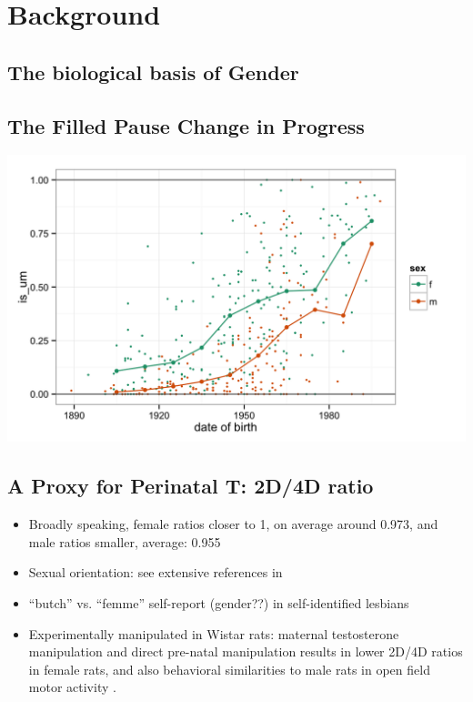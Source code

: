 \documentclass[a0,portrait]{a0poster}
\begin{document}
\begin{multicols}{2}
\begin{enumerate}
\end{enumerate}
\section*{Background}
\subsection{The biological basis of Gender}


\subsection{The Filled Pause Change in Progress}

\begin{center}\vspace{1cm}
\includegraphics[width=0.8\linewidth]{um.png}
\end{center}\vspace{1cm}

\subsection{A Proxy for Perinatal T: 2D/4D ratio}


\begin{itemize}
	\item Broadly speaking, female ratios closer to 1, on average around 0.973, and male ratios smaller, average: 0.955 \citep[][107]{balthazart2011}
	\item Sexual orientation: see extensive references in \citet{balthazart2011}
	\item ``butch'' vs. ``femme'' self-report (gender??) in self-identified lesbians \citep{brownetal2002}
	\item Experimentally manipulated in Wistar rats: maternal testosterone manipulation and direct pre-natal manipulation results in lower 2D/4D ratios in female rats, and also behavioral similarities to male rats in open field motor activity \citep{talarovicovaetal2009}.
\end{itemize}


\end{multicols}
\end{document}
